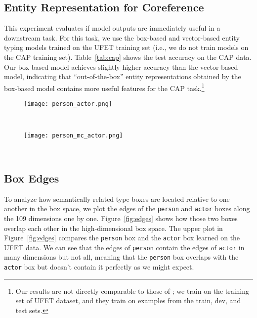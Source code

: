 \documentclass[11pt,a4paper]{article}
\begin{document}
\subsection{Entity Representation for Coreference}
This experiment evaluates if model outputs are immediately useful in a downstream task. For this task, we use the box-based and vector-based entity typing models trained on the UFET training set (i.e., we do not train models on the CAP training set). Table~\ref{tab:cap} shows the test accuracy on the CAP data. Our box-based model achieves slightly higher accuracy than the vector-based model, indicating that ``out-of-the-box'' entity representations obtained by the box-based model contains more useful features for the CAP task.\footnote{Our results are not directly comparable to those of \citet{Yasumasa_Onoe_20_Findings}; we train on the training set of UFET dataset, and they train on examples from the train, dev, and test sets.}




\begin{figure*}[t!]
\centering
\begin{subfigure}[H]{\linewidth}
\centering
  \texttt{[image: person\_actor.png]}
  \vspace{-16pt}
  \caption{}
\end{subfigure}\\
\vspace{6pt}
\begin{subfigure}[H]{\linewidth}
\centering
   \texttt{[image: person\_mc\_actor.png]}
   \vspace{-16pt}
   \caption{}
\end{subfigure}\\
\vspace{-6pt}
\caption{Edges of (a) the {\tt person} box vs the {\tt actor} box and (b) the {\tt person} box vs the minimum bounding box of the intersections between mention \& context boxes and the {\tt actor} box.}
\label{fig:edges}
\vspace{-8pt}
\end{figure*}



\subsection{Box Edges}\label{sec:box_overlaps}
To analyze how semantically related type boxes are located relative to one another in the box space, we plot the edges of the {\tt person} and {\tt actor} boxes along the 109 dimensions one by one. Figure~\ref{fig:edges} shows how those two boxes overlap each other in the high-dimensional box space. The upper plot in Figure~\ref{fig:edges} compares the {\tt person} box and the {\tt actor} box learned on the UFET data. We can see that the edges of {\tt person} contain the edges of {\tt actor} in many dimensions but not all, meaning that the {\tt person} box overlaps with the {\tt actor} box but doesn't contain it perfectly as we might expect.
\end{document}
